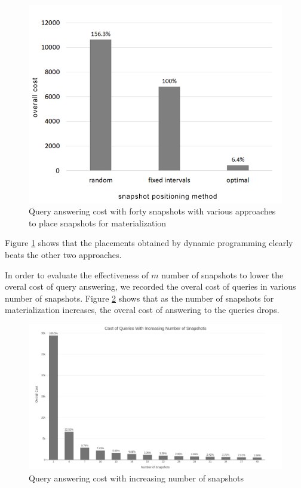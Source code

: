 \begin{figure}
	\label{fig:approaches_cost}
	\centering
	\includegraphics[width=\textwidth]{figs/various_scenarios_cost.jpg}
	\caption{Query answering cost with forty snapshots with various approaches to place snapshots for materialization}
\end{figure} 

Figure \ref{fig:approaches_cost} shows that the placements obtained by dynamic programming clearly beats the other two approaches.

In order to evaluate the effectiveness of $m$ number of snapshots to lower the overal cost of query answering, we recorded the overal cost of queries in various number of snapshots. Figure \ref{fig:snapshots_cost} shows that as the number of snapshots for materialization increases, the overal cost of answering to the queries drops.

\begin{figure}
	\label{fig:snapshots_cost}
	\centering
	\includegraphics[width=\textwidth]{figs/various_snapshot.jpg}
	\caption{Query answering cost with increasing number of snapshots}
\end{figure} 

